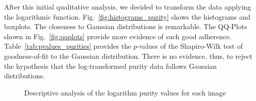 \documentclass[12pt]{article}
\begin{document}
After this initial qualitative analysis, we decided to transform the data applying the logarithmic function.
Fig.~\ref{fig:histograms_purity} shows the histograms and boxplots. 
The closeness to Gaussian distributions is remarkable.
The QQ-Plots shown in Fig.~\ref{fig:qqplots} provide more evidence of such good adherence.
Table~\ref{tab:pvalues_purities} provides the $p$-values of the Shapiro-Wilk test of goodness-of-fit to the Gaussian distribution.
There is no evidence, thus, to reject the hypothesis that the log-transformed purity data follows Gaussian distributions.

\begin{figure}[hbt]
  \centering
  \caption{Descriptive analysis of the logarithm purity values for each image}
  \label{fig:desc_analysis}
\end{figure}
\end{document}
